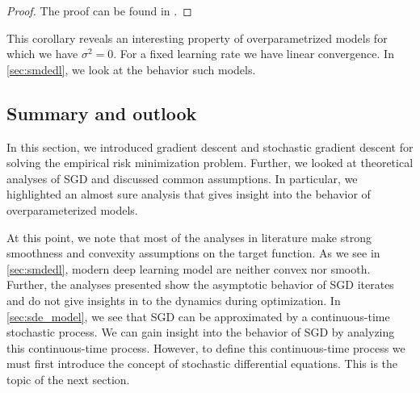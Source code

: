 \documentclass[12pt]{article}
\theoremstyle{definition}
\newtheorem{assumption}[assumption]{Assumption}
\numberwithin{equation}{section}
\newcommand{\R}{\mathbb{R}}
\begin{document}
\begin{proof}
  The proof can be found in \cite{sebbouhAlmostSureConvergence2021}.
\end{proof}
  This corollary reveals an interesting property of overparametrized models for which we have $\sigma^2 = 0$. For a fixed learning rate we have linear convergence. In \autoref{sec:smdedl}, we look at the behavior such models.

\subsection{Summary and outlook}
In this section, we introduced gradient descent and stochastic gradient descent for solving the empirical risk minimization problem. Further, we looked at theoretical analyses of SGD and discussed common assumptions. In particular, we highlighted an almost sure analysis that gives insight into the behavior of overparameterized models. 

At this point, we note that most of the analyses in literature make strong smoothness and convexity assumptions on the target function. As we see in \autoref{sec:smdedl}, modern deep learning model are neither convex nor smooth. Further, the analyses presented show the asymptotic behavior of SGD iterates and do not give insights in to the dynamics during optimization. 
In \autoref{sec:sde_model}, we see that SGD can be approximated by a continuous-time stochastic process. We can gain insight into the behavior of SGD by analyzing this continuous-time process. However, to define this continuous-time process we must first introduce the concept of stochastic differential equations. This is the topic of the next section.
\end{document}
